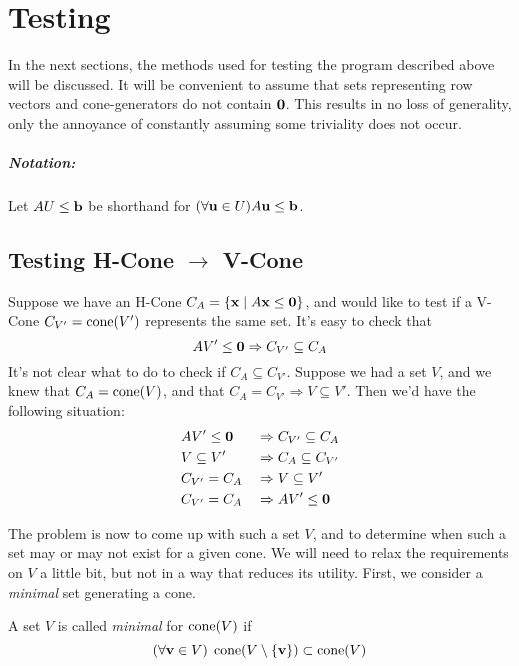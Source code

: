 \chapter{Testing}

In the next sections, the methods used for testing the program described above will be discussed.  It will be convenient to assume that sets representing row vectors and cone-generators do not contain $\mathbf{0}$.  This results in no loss of generality, only the annoyance of constantly assuming some triviality does not occur.

\paragraph{Notation:} Let $AU \leq \mathbf{b}$ be shorthand for $(\forall \mathbf{u}\in U) A\mathbf{u} \leq \mathbf{b}$.

\section{Testing H-Cone $\to$ V-Cone}
Suppose we have an H-Cone $C_A= \left\{\mathbf{x}\;|\; A\mathbf{x}\leq\mathbf{0}\right\}$, and would like to test if a V-Cone $C_{V'} = \operatorname{cone}(V')$ represents the same set.  It's easy to check that
\[ AV'\leq\mathbf{0} \Rightarrow C_{V'} \subseteq C_A\]
It's not clear what to do to check if $C_A\subseteq C_{V'}$.  Suppose we had a set $V$, and we knew that $C_A= \operatorname{cone}(V)$, and that $C_A= C_{V'} \Rightarrow V \subseteq V'$.  Then we'd have the following situation:
\begin{alignat*}{2}
	 & AV'\leq\mathbf{0} \;      & \Rightarrow & \; C_{V'} \subseteq C_A \\
	 & V \subseteq V' \; & \Rightarrow & \; C_A\subseteq C_{V'}  \\
	 & C_{V'} = C_A \;   & \Rightarrow & \; V \subseteq V'       \\
	 & C_{V'} = C_A \;   & \Rightarrow & \; AV'\leq\mathbf{0}
\end{alignat*}

The problem is now to come up with such a set $V$, and to determine when such a set may or may not exist for a given cone.  We will need to relax the requirements on $V$ a little bit, but not in a way that reduces its utility.  First, we consider a \textit{minimal} set generating a cone.

\begin{Def}
	A set $V$ is called \textit{minimal} for $\operatorname{cone}(V)$ if
	\[ (\forall \mathbf{v} \in V)\; \operatorname{cone}(V\setminus\{\mathbf{v}\}) \subset \operatorname{cone}(V) \]
\end{Def}

